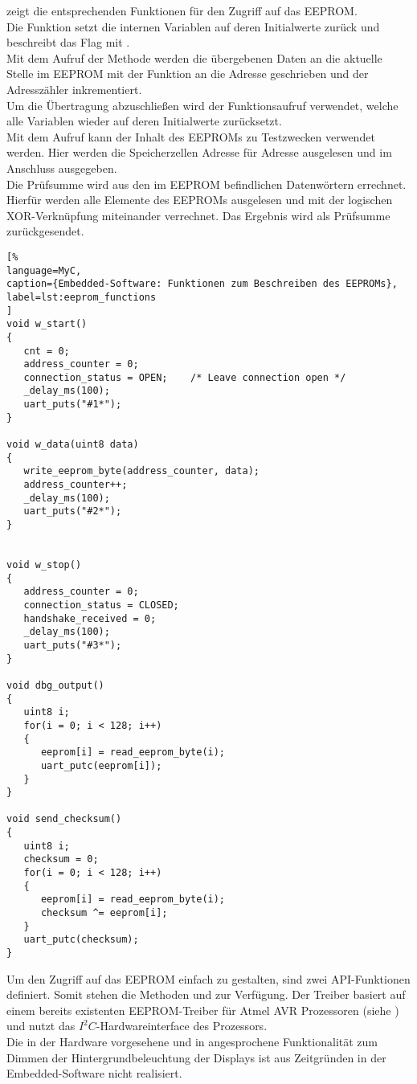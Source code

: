  zeigt die entsprechenden Funktionen für den Zugriff auf das EEPROM.\\
Die Funktion  setzt die internen Variablen auf deren Initialwerte zurück und beschreibt das Flag   mit .\\
Mit dem Aufruf der Methode  werden die übergebenen Daten  an die aktuelle Stelle im EEPROM mit der Funktion  an die Adresse  geschrieben und der Adresszähler inkrementiert.\\
Um die Übertragung abzuschließen wird der Funktionsaufruf  verwendet, welche alle Variablen wieder auf deren Initialwerte zurücksetzt.\\
Mit dem Aufruf  kann der Inhalt des EEPROMs zu Testzwecken verwendet werden. Hier werden die Speicherzellen Adresse für Adresse ausgelesen und im Anschluss ausgegeben.\\
Die Prüfsumme wird aus den im EEPROM befindlichen Datenwörtern errechnet. Hierfür werden alle Elemente des EEPROMs ausgelesen und mit der logischen XOR-Verknüpfung miteinander verrechnet. Das Ergebnis wird als Prüfsumme zurückgesendet. 

\begin{lstlisting}[%
language=MyC,
caption={Embedded-Software: Funktionen zum Beschreiben des EEPROMs},
label=lst:eeprom_functions
]
void w_start()
{
   cnt = 0;
   address_counter = 0;
   connection_status = OPEN;    /* Leave connection open */
   _delay_ms(100);
   uart_puts("#1*");
}

void w_data(uint8 data)
{
   write_eeprom_byte(address_counter, data);
   address_counter++;
   _delay_ms(100);
   uart_puts("#2*");
}


void w_stop()
{
   address_counter = 0;
   connection_status = CLOSED;
   handshake_received = 0;
   _delay_ms(100);
   uart_puts("#3*");
}

void dbg_output()
{
   uint8 i;
   for(i = 0; i < 128; i++)
   {
      eeprom[i] = read_eeprom_byte(i);
      uart_putc(eeprom[i]);
   }
}

void send_checksum()
{
   uint8 i;
   checksum = 0;
   for(i = 0; i < 128; i++)
   {
      eeprom[i] = read_eeprom_byte(i);
      checksum ^= eeprom[i];
   }
   uart_putc(checksum);
}
\end{lstlisting}%
Um den Zugriff auf das EEPROM einfach zu gestalten, sind zwei API-Funktionen definiert. Somit stehen die Methoden  und  zur Verfügung. Der Treiber basiert auf einem bereits existenten EEPROM-Treiber für Atmel AVR Prozessoren (siehe \cite{eeprom_lib}) und nutzt das $I^2C$-Hardwareinterface des Prozessors. \\
Die in der Hardware vorgesehene und in  angesprochene Funktionalität zum Dimmen der Hintergrundbeleuchtung der Displays ist aus Zeitgründen in der Embedded-Software nicht realisiert. 
